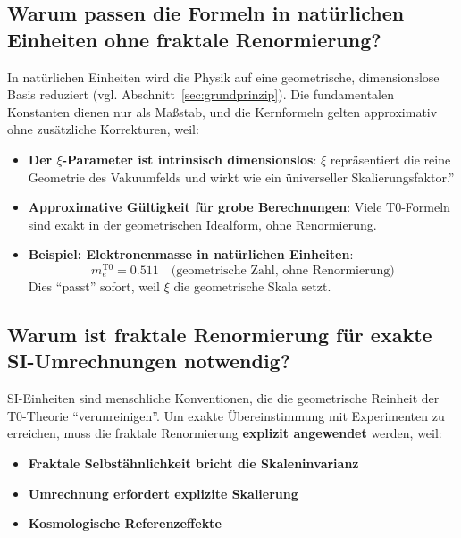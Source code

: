 	\subsection{Warum passen die Formeln in natürlichen Einheiten ohne fraktale Renormierung?}
	
	In natürlichen Einheiten wird die Physik auf eine geometrische, dimensionslose Basis reduziert (vgl. Abschnitt~\ref{sec:grundprinzip}). Die fundamentalen Konstanten dienen nur als Maßstab, und die Kernformeln gelten approximativ ohne zusätzliche Korrekturen, weil:
	
	\begin{itemize}
		\item \textbf{Der $\xi$-Parameter ist intrinsisch dimensionslos}: $\xi$ repräsentiert die reine Geometrie des Vakuumfelds und wirkt wie ein üniverseller Skalierungsfaktor.''
		
		\item \textbf{Approximative Gültigkeit für grobe Berechnungen}: Viele T0-Formeln sind exakt in der geometrischen Idealform, ohne Renormierung.
		
		\item \textbf{Beispiel: Elektronenmasse in natürlichen Einheiten}:
		\begin{equation}
			m_e^{\mathrm{T0}} = 0.511 \quad \text{(geometrische Zahl, ohne Renormierung)}
		\end{equation}
		Dies ``passt'' sofort, weil $\xi$ die geometrische Skala setzt.
	\end{itemize}
	
	\subsection{Warum ist fraktale Renormierung für exakte SI-Umrechnungen notwendig?}
	
	SI-Einheiten sind menschliche Konventionen, die die geometrische Reinheit der T0-Theorie ``verunreinigen''. Um exakte Übereinstimmung mit Experimenten zu erreichen, muss die fraktale Renormierung \textbf{explizit angewendet} werden, weil:
	
	\begin{itemize}
		\item \textbf{Fraktale Selbstähnlichkeit bricht die Skaleninvarianz}
		\item \textbf{Umrechnung erfordert explizite Skalierung}
		\item \textbf{Kosmologische Referenzeffekte}
	\end{itemize}
	
